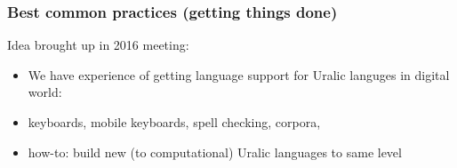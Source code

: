 \documentclass{beamer}
\begin{document}
\begin{frame}
    \frametitle{Best common practices (getting things done)}
    Idea brought up in 2016 meeting:
    \begin{itemize}
        \item We have experience of getting language support for Uralic languges
            in digital world:
        \item keyboards, mobile keyboards, spell checking, corpora,
        \item how-to: build new (to computational) Uralic languages to same level
    \end{itemize}
\end{frame}
\end{document}

